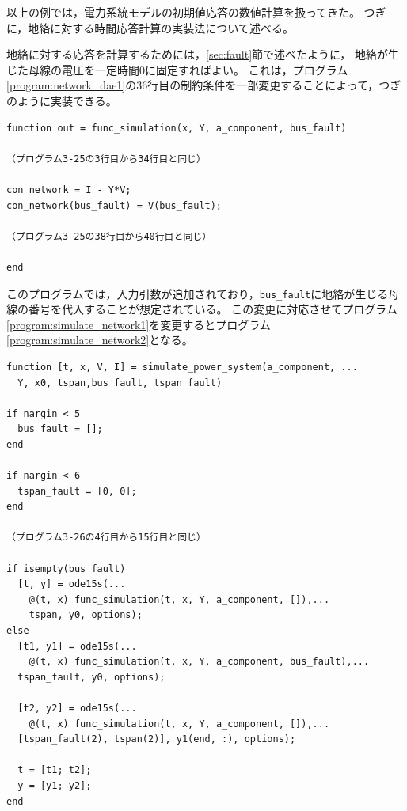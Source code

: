 \documentclass[tombow,dvipdfmx]{corona-a5-1.1}
\begin{document}
以上の例では，電力系統モデルの初期値応答の数値計算を扱ってきた。
つぎに，地絡に対する時間応答計算の実装法について述べる。

\begin{例}[地絡に対する時間応答の数値計算]
地絡に対する応答を計算するためには，\ref{sec:fault}節で述べたように，
地絡が生じた母線の電圧を一定時間$0$に固定すればよい。
これは，プログラム\nobreak\ref{program:network_dae1}の36行目の制約条件を一部変更することによって，つぎのように実装できる。

\smallskip
\begin{PROGRAMA}[count,title={func\_simulation.m}]\label{program:network_dae_fault}
\begin{verbatim}
function out = func_simulation(x, Y, a_component, bus_fault)

（プログラム3-25の3行目から34行目と同じ）

con_network = I - Y*V;
con_network(bus_fault) = V(bus_fault);

（プログラム3-25の38行目から40行目と同じ）

end
\end{verbatim}
\end{PROGRAMA}

このプログラムでは，入力引数が追加されており，\verb|bus_fault|に地絡が生じる母線の番号を代入することが想定されている。
この変更に対応させてプログラム\nobreak\ref{program:simulate_network1}を変更するとプログラム\ref{program:simulate_network2}となる。

\smallskip
\begin{PROGRAMA}[count,title={simulate\_power\_system.m}]\label{program:simulate_network2}
  \begin{verbatim}
function [t, x, V, I] = simulate_power_system(a_component, ...
  Y, x0, tspan,bus_fault, tspan_fault)

if nargin < 5
  bus_fault = [];
end

if nargin < 6
  tspan_fault = [0, 0];
end

（プログラム3-26の4行目から15行目と同じ）

if isempty(bus_fault)
  [t, y] = ode15s(...
    @(t, x) func_simulation(t, x, Y, a_component, []),...
    tspan, y0, options);
else
  [t1, y1] = ode15s(...
    @(t, x) func_simulation(t, x, Y, a_component, bus_fault),...
  tspan_fault, y0, options);
  
  [t2, y2] = ode15s(...
    @(t, x) func_simulation(t, x, Y, a_component, []),...
  [tspan_fault(2), tspan(2)], y1(end, :), options);

  t = [t1; t2];
  y = [y1; y2];
end


\end{verbatim}
\end{PROGRAMA}
\end{例}
\end{document}
